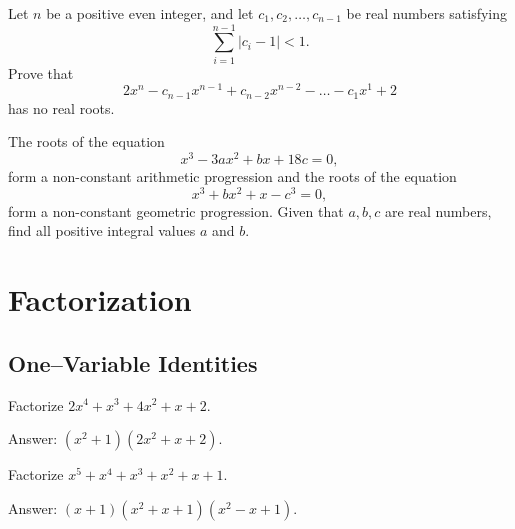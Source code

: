 \documentclass[12pt,a4paper]{memoir}
\theoremstyle{definition}
\begin{document}
\begin{question}[name={2014 USA TST}]
	Let $n$ be a positive even integer, and let $c_1, c_2, \dots, c_{n-1}$ be real numbers satisfying\[ \sum_{i=1}^{n-1} \left\lvert c_i-1 \right\rvert < 1. \] Prove that \[
	2x^n - c_{n-1}x^{n-1} + c_{n-2}x^{n-2} - \dots - c_1x^1 + 2\] has no real roots.
\end{question}


\begin{question}[name={2014 India Regional}]
	The roots of the equation
	\[ x^3-3ax^2+bx+18c=0, \]
	form a non-constant arithmetic progression and the roots of the equation
	\[ x^3+bx^2+x-c^3=0, \]
	form a non-constant geometric progression. Given that $a,b,c$ are real numbers, find all positive integral values $a$ and $b$.
\end{question}

\newpage
%


\section{Factorization}

\subsection{One--Variable Identities}


\begin{tcolorbox}
	\begin{question}
		Factorize $2x^4 + x^3 + 4x^2 + x + 2$.
	\end{question}
\end{tcolorbox}

\begin{solution}[name=Solution by Parviz Shahriari]
	Answer: $(x^2+1)(2x^2+x+2)$.
\end{solution}




\begin{tcolorbox}
	\begin{question}
		Factorize $x^5+x^4+x^3+x^2+x+1$.
	\end{question}
\end{tcolorbox}

\begin{solution}[name=Solution by Parviz Shahriari]
	Answer: $(x+1)(x^2+x+1)(x^2-x+1)$.
\end{solution}
\end{document}
